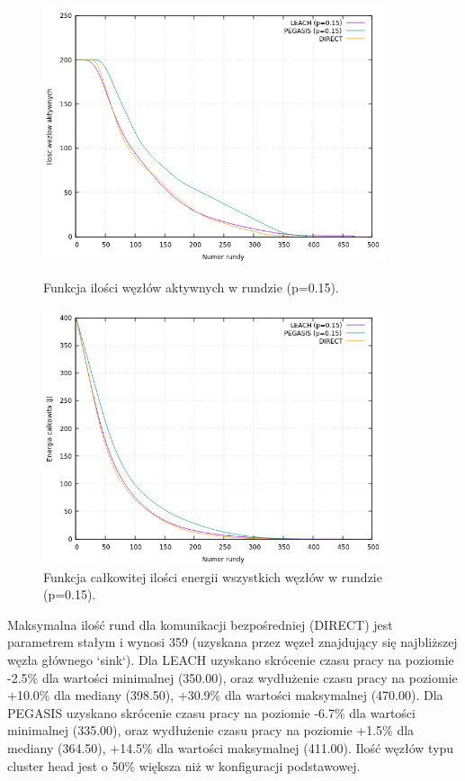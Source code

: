 \documentclass[a4paper,12pt,twoside,openany]{report}
\begin{document}
\begin{figure}[H]
 \centering
 \includegraphics[width=10cm]{images/gnuplot/test_4/nodes_in_round_p015.png}
 \caption{Funkcja ilości węzłów aktywnych w rundzie (p=0.15).}
 \includegraphics[width=10cm]{images/gnuplot/test_4/energy_in_round_p015.png}
 \caption{Funkcja całkowitej ilości energii wszystkich węzłów w rundzie (p=0.15).}
\end{figure}

\par
Maksymalna ilość rund dla komunikacji bezpośredniej (DIRECT) jest parametrem stałym i wynosi 359 (uzyskana przez węzeł znajdujący się najbliższej węzła głównego `sink`).
Dla LEACH uzyskano skrócenie czasu pracy na poziomie -2.5\% dla wartości minimalnej (350.00), oraz wydłużenie czasu pracy na poziomie +10.0\% dla mediany (398.50), +30.9\% dla wartości maksymalnej (470.00).
Dla PEGASIS uzyskano skrócenie czasu pracy na poziomie -6.7\% dla wartości minimalnej (335.00), oraz wydłużenie czasu pracy na poziomie +1.5\% dla mediany (364.50), +14.5\% dla wartości maksymalnej (411.00).
Ilość węzłów typu cluster head jest o 50\% większa niż w konfiguracji podstawowej.
\end{document}
